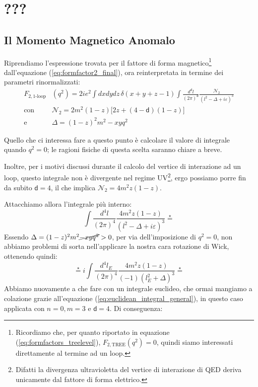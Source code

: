 \documentclass[../main.tex]{subfiles}
\begin{document}
\setchapterpreamble[u]{\margintoc}
\chapter[???]{???\footnotemark[0]}
\fboxsep =1pt %

\section{}
\section{}


\section{Il Momento Magnetico Anomalo}
Riprendiamo l'espressione trovata per il fattore di forma magnetico\footnote{Ricordiamo che, per quanto riportato in equazione (\ref{eq:formfactors_treelevel}), \(F_{2, \text{TREE}}(q^2) = 0\), quindi siamo interessati direttamente al termine ad un loop.} dall'equazione (\ref{eq:formfactor2_final}), ora reinterpretata in termine dei parametri rinormalizzati:
\[
\begin{aligned}
    F_{2,\text{1-loop}}&(q^2) = 2ie^2\int dxdydz \,\delta(x+y+z-1) \int \frac{d^\mathsf d l}{(2\pi)^\mathsf d} \frac{\mathscr{N}_2}{(l^2-\Delta+i\varepsilon)^3}\\
    \text{con }&\mathscr{N}_2 = 2m^2(1-z)\bigl[ 2z + (4-\mathsf d)(1-z) \bigr]\\
    \text{e }& \Delta = (1-z)^2m^2 -xyq^2
\end{aligned}
\]

Quello che ci interessa fare a questo punto è calcolare il valore di integrale quando \(q^2=0\); le ragioni fisiche di questa scelta saranno chiare a breve.

Inoltre, per i motivi discussi durante il calcolo del vertice di interazione ad un loop, questo integrale non è divergente nel regime UV\footnote{Difatti la divergenza ultravioletta del vertice di interazione di QED deriva unicamente dal fattore di forma elettrico.}, ergo possiamo porre fin da subito \(\mathsf d = 4\), il che implica \(\boxed{\mathscr{N}_2 = 4m^2z(1-z)}\).

Attacchiamo allora l'integrale più interno:
\[
 \int \frac{d^4 l}{(2\pi)^4} \frac{4m^2z(1-z)}{(l^2-\Delta+i\varepsilon)^3} \overset{\star}{=}
\]
Essendo \(\Delta = (1-z)^2m^2 \cancel{-xyq^2} > 0\), per via dell'imposizione di \(q^2=0\), non abbiamo problemi di sorta nell'applicare la nostra cara rotazione di Wick, ottenendo quindi:
\[
\overset{\star}{=}  i\int \frac{d^4 l_E}{(2\pi)^4} \frac{4m^2z(1-z)}{(-1)(l_E^2+\Delta)^3} \overset{\star}{=} 
\]
Abbiamo nuovamente a che fare con un integrale euclideo, che ormai mangiamo a colazione grazie all'equazione (\ref{eq:euclidean_integral_general}), in questo caso applicata con \(n=0, m=3\) e \(\mathsf d =4\). Di conseguenza:
\end{document}
